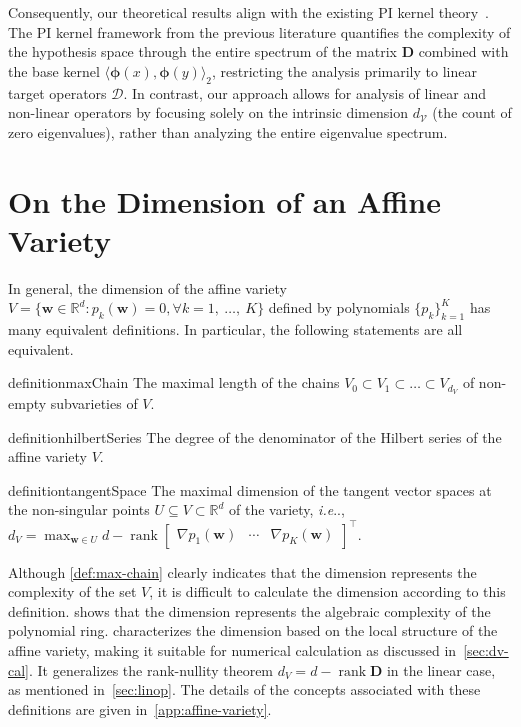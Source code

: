 \documentclass{article}
\makeatletter
\def\mD{{\bm{D}}}
\def\@onedot{\ifx\@let@token.\else.\null\fi\xspace}
\DeclareRobustCommand\onedot{\futurelet\@let@token\@onedot}
\def\ie{\emph{i.e}\onedot}
\theoremstyle{plain}
\theoremstyle{definition}
\theoremstyle{remark}
\makeatother
\begin{document}
Consequently, our theoretical results align with the existing PI kernel theory~\citep{doumeche2024physics,doumeche2024physics2}. The PI kernel framework from the previous literature quantifies the complexity of the hypothesis space through the entire spectrum of the matrix $\mD$ combined with the base kernel $\langle \bm{\phi}(x), \bm{\phi}(y) \rangle_{2}$, restricting the analysis primarily to linear target operators $\mathscr{D}$. In contrast, our approach allows for analysis of linear and non-linear operators by focusing solely on the intrinsic dimension $d_{\mathcal{V}}$ (the count of zero eigenvalues), rather than analyzing the entire eigenvalue spectrum.


\section{On the Dimension of an Affine Variety}
\label{sec:dim-variety}
In general, the dimension of the affine variety \( V = \{ \bm{w} \in \mathbb{R}^d: p_k(\bm{w}) = 0, \forall k = 1,\ \ldots,\ K \} \) defined by polynomials $\{ p_k \}_{k=1}^K$ has many equivalent definitions. In particular, the following statements are all equivalent. 
\begin{restatable}{definition}{maxChain}\label{def:max-chain}
    The maximal length of the chains \( V_0 \subset V_1 \subset \ldots \subset V_{d_V} \) of non-empty subvarieties of \( V \).
\end{restatable}
\begin{restatable}{definition}{hilbertSeries}\label{def:hilbert-series} The degree of the denominator of the Hilbert series of the affine variety \(V\).
\end{restatable}
\begin{restatable}{definition}{tangentSpace}\label{def:tangent-space} The maximal dimension of the tangent vector spaces at the non-singular points \( U \subseteq V \subset \mathbb{R}^d \) of the variety, \ie, $d_V = \max_{\bm{w} \in U} d - \operatorname{rank}
    \begin{bmatrix} 
        \nabla p_1(\bm{w}) &
        \cdots &
        \nabla p_K(\bm{w}) 
    \end{bmatrix}^{\top}$.
\end{restatable}

Although \cref{def:max-chain} clearly indicates that the dimension represents the complexity of the set \( V \), it is difficult to calculate the dimension according to this definition.  shows that the dimension represents the algebraic complexity of the polynomial ring.  characterizes the dimension based on the local structure of the affine variety, making it suitable for numerical calculation as discussed in~\cref{sec:dv-cal}. It generalizes the rank-nullity theorem \( d_{V} = d - \operatorname{rank} \mD \) in the linear case, as mentioned in~\cref{sec:linop}. The details of the concepts associated with these definitions are given in~\cref{app:affine-variety}. 
\end{document}
